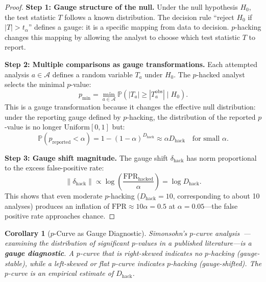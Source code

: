 \documentclass[12pt,a4paper]{article}
\newtheorem{corollary}[theorem]{Corollary}
\theoremstyle{remark}
\newcommand{\Pbb}{\mathbb{P}}
\begin{document}
\begin{proof}
\noindent\textbf{Step 1: Gauge structure of the null.}
Under the null hypothesis $H_0$, the test statistic $T$ follows a known
distribution. The decision rule ``reject $H_0$ if $|T| > t_{\alpha}$''
defines a gauge: it is a specific mapping from data to decision. $p$-hacking
changes this mapping by allowing the analyst to choose which test
statistic $T$ to report.

\smallskip
\noindent\textbf{Step 2: Multiple comparisons as gauge transformations.}
Each attempted analysis $a \in \mathcal{A}$ defines a random variable
$T_a$ under $H_0$. The $p$-hacked analyst selects the minimal $p$-value:
\begin{equation}
  p_{\text{min}} = \min_{a \in \mathcal{A}} \Pbb(|T_a| \geq
  |T_a^{\text{obs}}| \mid H_0).
\end{equation}
This is a gauge transformation because it changes the effective null
distribution: under the reporting gauge defined by $p$-hacking, the
distribution of the reported $p$-value is no longer $\text{Uniform}[0,1]$
but:
\begin{equation}
  \Pbb(p_{\text{reported}} < \alpha) = 1 - (1 - \alpha)^{D_{\text{hack}}}
  \approx \alpha D_{\text{hack}} \quad \text{for small } \alpha.
\end{equation}

\smallskip
\noindent\textbf{Step 3: Gauge shift magnitude.}
The gauge shift $\delta_{\text{hack}}$ has norm proportional to the excess
false-positive rate:
\begin{equation}
  \|\delta_{\text{hack}}\| \propto \log\left(\frac{\text{FPR}_{\text{hacked}}}
  {\alpha}\right) = \log D_{\text{hack}}.
\end{equation}
This shows that even moderate $p$-hacking ($D_{\text{hack}} = 10$,
corresponding to about 10 analyses) produces an inflation of
$\text{FPR} \approx 10 \alpha = 0.5$ at $\alpha = 0.05$---the false
positive rate approaches chance.
\end{proof}

\begin{corollary}[$p$-Curve as Gauge Diagnostic]
\label{cor:pcurve}
Simonsohn's $p$-curve analysis~\cite{simonsohn2014pcurve}---examining the
distribution of significant $p$-values in a published literature---is a
\textbf{gauge diagnostic}. A $p$-curve that is right-skewed indicates no
$p$-hacking (gauge-stable), while a left-skewed or flat $p$-curve
indicates $p$-hacking (gauge-shifted). The $p$-curve is an empirical
estimate of $D_{\text{hack}}$.
\end{corollary}
\end{document}
